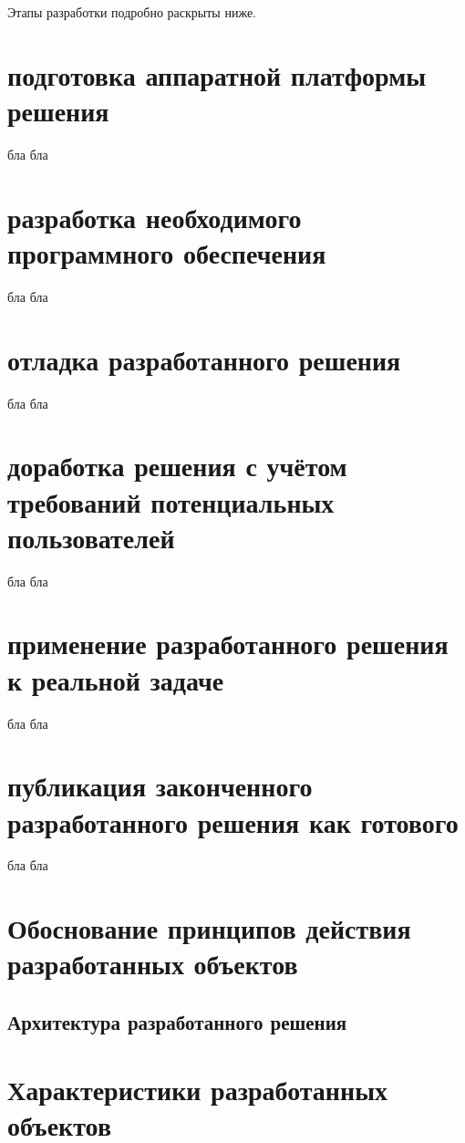 Этапы разработки подробно раскрыты ниже.

\section{подготовка аппаратной платформы решения}
бла бла

\section{разработка необходимого программного обеспечения}
бла бла
\section{отладка разработанного решения}
бла бла
\section{доработка решения с учётом требований потенциальных пользователей}
бла бла
\section{применение разработанного решения к реальной задаче}
бла бла
\section{публикация законченного разработанного решения как готового}
бла бла

\section{Обоснование принципов действия разработанных объектов}
\subsection{Архитектура разработанного решения}

\section{Характеристики разработанных объектов}
